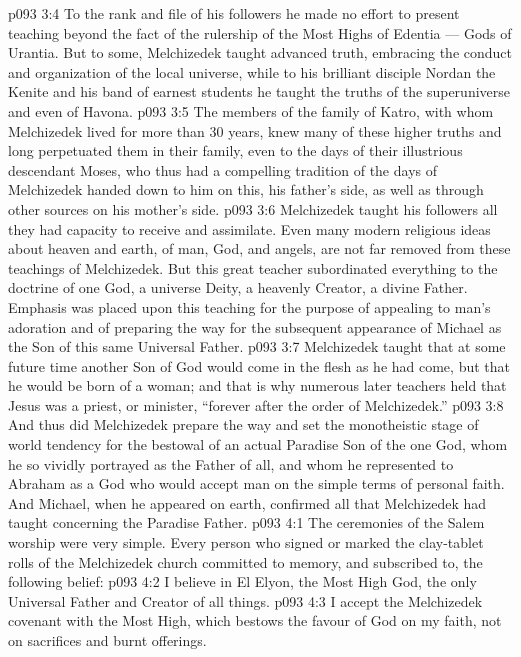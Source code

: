 \vs p093 3:4 To the rank and file of his followers he made no effort to present teaching beyond the fact of the rulership of the Most Highs of Edentia --- Gods of Urantia. But to some, Melchizedek taught advanced truth, embracing the conduct and organization of the local universe, while to his brilliant disciple Nordan the Kenite and his band of earnest students he taught the truths of the superuniverse and even of Havona.
\vs p093 3:5 The members of the family of Katro, with whom Melchizedek lived for more than 30 years, knew many of these higher truths and long perpetuated them in their family, even to the days of their illustrious descendant Moses, who thus had a compelling tradition of the days of Melchizedek handed down to him on this, his father’s side, as well as through other sources on his mother’s side.
\vs p093 3:6 Melchizedek taught his followers all they had capacity to receive and assimilate. Even many modern religious ideas about heaven and earth, of man, God, and angels, are not far removed from these teachings of Melchizedek. But this great teacher subordinated everything to the doctrine of one God, a universe Deity, a heavenly Creator, a divine Father. Emphasis was placed upon this teaching for the purpose of appealing to man’s adoration and of preparing the way for the subsequent appearance of Michael as the Son of this same Universal Father.
\vs p093 3:7 Melchizedek taught that at some future time another Son of God would come in the flesh as he had come, but that he would be born of a woman; and that is why numerous later teachers held that Jesus was a priest, or minister, “forever after the order of Melchizedek.”
\vs p093 3:8 And thus did Melchizedek prepare the way and set the monotheistic stage of world tendency for the bestowal of an actual Paradise Son of the one God, whom he so vividly portrayed as the Father of all, and whom he represented to Abraham as a God who would accept man on the simple terms of personal faith. And Michael, when he appeared on earth, confirmed all that Melchizedek had taught concerning the Paradise Father.
\vs p093 4:1 The ceremonies of the Salem worship were very simple. Every person who signed or marked the clay\hyp{}tablet rolls of the Melchizedek church committed to memory, and subscribed to, the following belief:
\vs p093 4:2 \bibnobreakspace I believe in El Elyon, the Most High God, the only Universal Father and Creator of all things.
\vs p093 4:3 \bibnobreakspace I accept the Melchizedek covenant with the Most High, which bestows the favour of God on my faith, not on sacrifices and burnt offerings.
